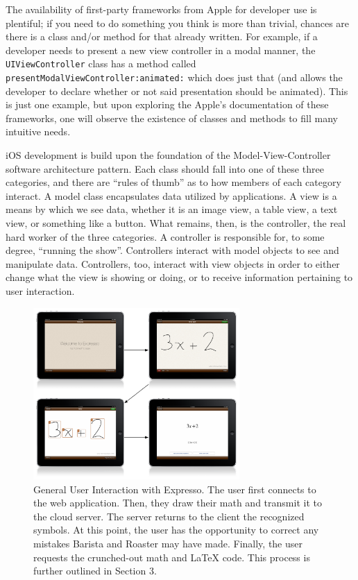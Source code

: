 \documentclass{acm_proc_article-sp}
\begin{document}
The availability of first-party frameworks from Apple for developer use is plentiful; if you need to do something you think is more than trivial, chances are there is a class and/or method for that already written. For example, if a developer needs to present a new view controller in a modal manner, the \texttt{UIViewController} class has a method called \texttt{presentModalViewController:animated:} which does just that (and allows the developer to declare whether or not said presentation should be animated). This is just one example, but upon exploring the Apple's documentation of these frameworks, one will observe the existence of classes and methods to fill many intuitive needs.

iOS development is build upon the foundation of the Model-View-Controller software architecture pattern. Each class should fall into one of these three categories, and there are ``rules of thumb'' as to how members of each category interact. A model class encapsulates data utilized by applications. A view is a means by which we see data, whether it is an image view, a table view, a text view, or something like a button. What remains, then, is the controller, the real hard worker of the three categories. A controller is responsible for, to some degree, ``running the show''. Controllers interact with model objects to see and manipulate data. Controllers, too, interact with view objects in order to either change what the view is showing or doing, or to receive information pertaining to user interaction.

\begin{figure}
\centering
\includegraphics[width=0.7\textwidth]{user_workflow.pdf}
\caption{General User Interaction with Expresso. The user first connects to the web application. Then, they draw their math and transmit it to the cloud server. The server returns to the client the recognized symbols. At this point, the user has the opportunity to correct any mistakes Barista and Roaster may have made. Finally, the user requests the crunched-out math and \LaTeX{} code. This process is further outlined in Section 3.}
\label{fig:user_workflow}
\end{figure}
\end{document}
